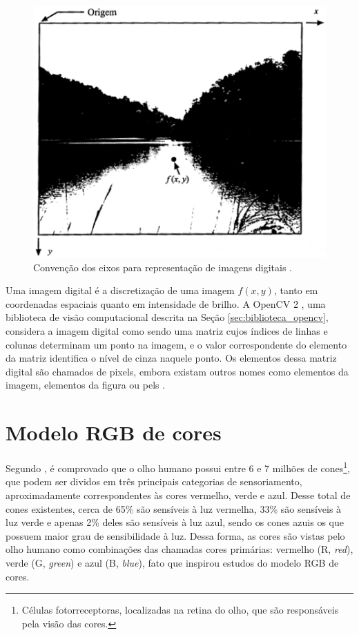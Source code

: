 \begin{figure}[ht]
  \begin{center}
    \includegraphics[scale=0.7]{imgs/imagem_digital.png}
  \end{center}
  \caption{Convenção dos eixos para representação de imagens digitais \citep{woods:2000:book}.}
  \label{fig:imagem_digital}
\end{figure}

Uma imagem digital é a discretização de uma imagem $f(x,y)$, tanto em coordenadas espaciais quanto em intensidade de brilho. A OpenCV 2 \citep{opencv_library}, uma biblioteca de visão computacional descrita na Seção \ref{sec:biblioteca_opencv}, considera a imagem digital como sendo uma matriz cujos índices de linhas e colunas determinam um ponto na imagem, e o valor correspondente do elemento da matriz identifica o nível de cinza naquele ponto. Os elementos dessa matriz digital são chamados de pixels, embora existam outros nomes como elementos da imagem, elementos da figura ou pels \citep{woods:2000:book}.


\section{Modelo RGB de cores} %
\label{sec:modelo_rgb_de_cores}

Segundo \cite{woods:2000:book}, é comprovado que o olho humano possui entre 6 e 7 milhões de cones\footnote{Células fotorreceptoras, localizadas na retina do olho, que são responsáveis pela visão das cores.}, que podem ser dividos em três principais categorias de sensoriamento, aproximadamente correspondentes às cores vermelho, verde e azul. Desse total de cones existentes, cerca de 65\% são sensíveis à luz vermelha, 33\% são sensíveis à luz verde e apenas 2\% deles são sensíveis à luz azul, sendo os cones azuis os que possuem maior grau de sensibilidade à luz. Dessa forma, as cores são vistas pelo olho humano como combinações das chamadas cores primárias: vermelho (R, \textit{red}), verde (G, \textit{green}) e azul (B, \textit{blue}), fato que inspirou estudos do modelo RGB de cores.

